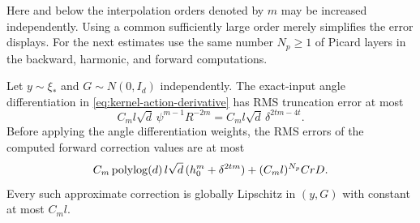Here and below the interpolation orders denoted by $m$ may be increased
independently.  Using a common sufficiently large order merely simplifies
the error displays.  For the next estimates use the same number
$N_p\ge1$ of Picard layers in the backward, harmonic, and forward
computations.

\begin{lemma}
\label{lem:kernel-angle-errors}
Let $y\sim\xi_*$ and $G\sim N(0,I_d)$ independently.  The exact-input
angle differentiation in \eqref{eq:kernel-action-derivative} has RMS
truncation error at most
\begin{equation}\label{eq:angle-stencil-error}
 C_m l\sqrt d\,\psi^{m-1}R^{-2m}
       =C_ml\sqrt d\,\delta^{2tm-4t}.
\end{equation}
Before applying the angle differentiation weights, the RMS errors of the
computed forward correction values are at most
\begin{equation}\label{eq:kernel-value-error}
 C_m\operatorname{polylog}(d)\,l\sqrt d\,(h_0^m+\delta^{2tm})
       +(C_ml)^{N_p}CrD.
\end{equation}
Every such approximate correction is globally Lipschitz in $(y,G)$
with constant at most $C_ml$.
\end{lemma}


